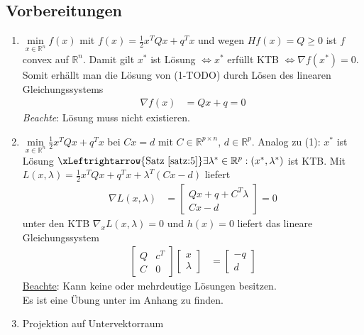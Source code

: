 \subsection{Vorbereitungen}
\begin{enumerate}[label=(\arabic*)]
  \item $\min\limits_{x\in\mathbb{R}^n}f(x)$ mit $f(x)=\frac12 x^TQx+q^Tx$ und wegen $H f(x)=Q\ge 0$ ist $f$ convex auf $\mathbb{R}^n$. Damit gilt $x^{\ast}$ ist Lösung
  $\Leftrightarrow x^{\ast}$ erfüllt \ac{KTB} $\Leftrightarrow\nabla f(x^{\ast})=0$. Somit erhällt man die Lösung von (1-TODO) durch Lösen des linearen Gleichungssystems
  \begin{align*}
  	\nabla f(x) & = Qx+q =0
  \end{align*} 
  \textit{Beachte}: Lösung muss nicht existieren.
  \item $\min\limits_{x\in\mathbb{R}^n}\frac12 x^TQx+q^Tx$ bei $Cx=d$ mit $C\in\mathbb{R}^{p\times n}$, $d\in\mathbb{R}^p$. Analog zu (1): $x^{\ast}$ ist Lösung
  $\xLeftrightarrow{\text{Satz \ref{satz:5}}}\exists\lambda^{\ast}\in\mathbb{R}^p:(x^{\ast},\lambda^{\ast})$ ist \ac{KTB}. Mit $L(x,\lambda)=\frac12
  x^TQx+q^Tx+\lambda^T(Cx-d)$ liefert
  \begin{align*}
  \nabla L(x,\lambda) & = \begin{bmatrix}
  Qx+q+C^T\lambda \\
  Cx-d
  \end{bmatrix} = 0
  \end{align*} 
  unter den \ac{KTB} $\nabla_xL(x,\lambda)=0$ und $h(x)=0$ liefert das lineare Gleichungssystem
  \begin{align*}
  \begin{bmatrix}
  Q	& c^T\\ C	& 0 
  \end{bmatrix}\begin{bmatrix}
  x\\ \lambda
  \end{bmatrix} & = \begin{bmatrix}
  -q \\ d
  \end{bmatrix}
  \end{align*}
  \underline{Beachte}: Kann keine oder mehrdeutige Lösungen besitzen.\\
  Es ist eine Übung unter  im Anhang zu finden.
  \item Projektion auf Untervektorraum\\

\end{enumerate}
